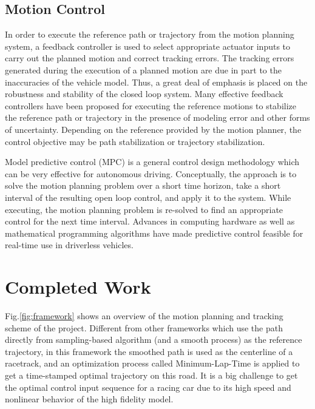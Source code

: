 \documentclass[conference, onecolumn]{IEEEtran}
\begin{document}
\subsection{Motion Control}
In order to execute the reference path or trajectory from the motion planning system, a feedback controller is used to select appropriate actuator inputs to carry out the planned motion and correct tracking errors. The tracking errors generated during the execution of a planned motion are due in part to the inaccuracies of the vehicle model. Thus, a great deal of emphasis is placed on the robustness and stability of the closed loop system.
Many effective feedback controllers have been proposed for executing the reference motions to stabilize the reference path or trajectory in the presence of modeling error and other forms of uncertainty. Depending on the reference provided by the motion planner, the control objective may be path stabilization or trajectory stabilization.

Model predictive control (MPC) is a general control design
methodology which can be very effective for autonomous driving. Conceptually, the approach is to solve the motion planning problem over a short time horizon, take a short interval of the resulting open loop control, and apply it to the system. While executing, the motion planning problem is re-solved to find an appropriate control for the next time interval. Advances in computing hardware as well as mathematical programming algorithms have made predictive control feasible for real-time use in driverless vehicles. 


\section{Completed Work}

Fig.\ref{fig:framework} shows an overview of the motion planning and tracking scheme of the project. Different from other frameworks which use the path directly from sampling-based algorithm (and a smooth process) as the reference trajectory, in this framework the smoothed path is used as the centerline of a racetrack, and an optimization process called Minimum-Lap-Time is applied to get a time-stamped optimal trajectory on this road. It is a big challenge to get the optimal control input sequence for a racing car due to its high speed and nonlinear behavior of the high fidelity model. 
\end{document}
